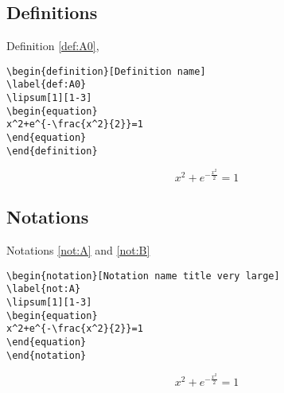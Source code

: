\subsection{Definitions}

Definition \ref{def:A0},

\begin{highlightbox}
\begin{verbatim}
\begin{definition}[Definition name]
\label{def:A0}
\lipsum[1][1-3]
\begin{equation}
x^2+e^{-\frac{x^2}{2}}=1
\end{equation}
\end{definition}
\end{verbatim}
\end{highlightbox}

\begin{definition}
\label{def:A0}
\lipsum[1][1-3]
\begin{equation}
x^2+e^{-\frac{x^2}{2}}=1
\end{equation}
\end{definition}




\subsection{Notations}

Notations \ref{not:A} and \ref{not:B}
\begin{highlightbox}
\begin{verbatim}
\begin{notation}[Notation name title very large]
\label{not:A}
\lipsum[1][1-3]
\begin{equation}
x^2+e^{-\frac{x^2}{2}}=1
\end{equation}
\end{notation}
\end{verbatim}
\end{highlightbox}
\begin{notation}
\label{not:A}
\lipsum[1][1-3]
\begin{equation}
x^2+e^{-\frac{x^2}{2}}=1
\end{equation}
\end{notation}

